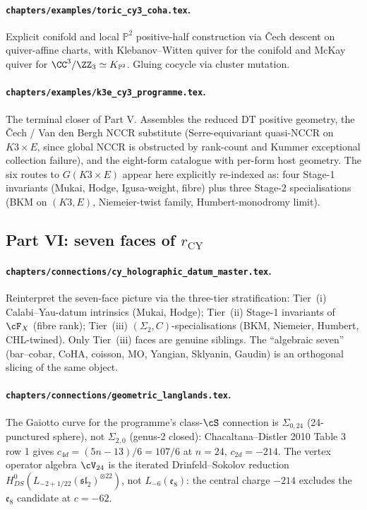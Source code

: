 \paragraph{\texttt{chapters/examples/toric\_cy3\_coha.tex}.} Explicit
conifold and local $\mathbb{P}^2$ positive-half construction via
\v{C}ech descent on quiver-affine charts, with Klebanov--Witten
quiver for the conifold and McKay quiver for $\CC^3/\ZZ_3 \simeq
K_{\mathbb{P}^2}$. Gluing cocycle via cluster mutation.

\paragraph{\texttt{chapters/examples/k3e\_cy3\_programme.tex}.} The
terminal closer of Part V. Assembles the reduced DT positive
geometry, the \v{C}ech / Van den Bergh NCCR substitute
(Serre-equivariant quasi-NCCR on $K3 \times E$, since global NCCR
is obstructed by rank-count and Kummer exceptional collection
failure), and the eight-form catalogue with per-form host
geometry. The six routes to $G(K3 \times E)$ appear here
explicitly re-indexed as: four Stage-1 invariants (Mukai, Hodge,
Igusa-weight, fibre) plus three Stage-2 specialisations (BKM on
$(K3, E)$, Niemeier-twist family, Humbert-monodromy limit).

\subsection*{Part VI: seven faces of $r_{\mathrm{CY}}$}

\paragraph{\texttt{chapters/connections/cy\_holographic\_datum\_master.tex}.}
Reinterpret the seven-face picture via the three-tier stratification:
Tier~(i) Calabi--Yau-datum intrinsics (Mukai, Hodge); Tier~(ii)
Stage-1 invariants of $\cF_X$ (fibre rank);
Tier~(iii) $(\Sigma_2, C)$-specialisations (BKM, Niemeier, Humbert,
CHL-twined). Only Tier~(iii) faces are genuine siblings. The
``algebraic seven'' (bar--cobar, CoHA, coisson, MO, Yangian,
Sklyanin, Gaudin) is an orthogonal slicing of the same object.

\paragraph{\texttt{chapters/connections/geometric\_langlands.tex}.}
The Gaiotto curve for the programme's class-$\cS$ connection is
$\Sigma_{0, 24}$ (24-punctured sphere), not $\Sigma_{2, 0}$
(genus-2 closed): Chacaltana--Distler 2010 Table 3 row 1 gives
$c_{4d} = (5n - 13)/6 = 107/6$ at $n = 24$, $c_{2d} = -214$. The
vertex operator algebra $\cV_{24}$ is the iterated Drinfeld--Sokolov
reduction $H^0_{DS}(L_{-2 + 1/22}(\mathfrak{sl}_2)^{\otimes 22})$,
not $L_{-6}(\mathfrak{e}_8)$: the central charge $-214$ excludes
the $\mathfrak{e}_8$ candidate at $c = -62$.

